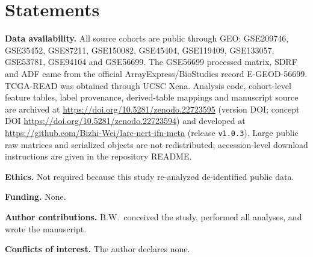 \documentclass[11pt,a4paper]{article}
\begin{document}
\section*{Statements}

\noindent\textbf{Data availability.} All source cohorts are public through GEO: GSE209746, GSE35452, GSE87211, GSE150082, GSE45404, GSE119409, GSE133057, GSE53781, GSE94104 and GSE56699. The GSE56699 processed matrix, SDRF and ADF came from the official ArrayExpress/BioStudies record E-GEOD-56699. TCGA-READ was obtained through UCSC Xena. Analysis code, cohort-level feature tables, label provenance, derived-table mappings and manuscript source are archived at \url{https://doi.org/10.5281/zenodo.22723595} (version DOI; concept DOI \url{https://doi.org/10.5281/zenodo.22723594}) and developed at \url{https://github.com/Bizhi-Wei/larc-ncrt-ifn-meta} (release \texttt{v1.0.3}). Large public raw matrices and serialized objects are not redistributed; accession-level download instructions are given in the repository README.

\vspace{0.4em}
\noindent\textbf{Ethics.} Not required because this study re-analyzed de-identified public data.

\vspace{0.4em}
\noindent\textbf{Funding.} None.

\vspace{0.4em}
\noindent\textbf{Author contributions.} B.W.\ conceived the study, performed all analyses, and wrote the manuscript.

\vspace{0.4em}
\noindent\textbf{Conflicts of interest.} The author declares none.
\end{document}
